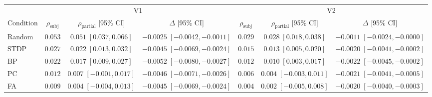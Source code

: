 \begin{tabular}{lcccccc}
\toprule
 & \multicolumn{3}{c}{V1} & \multicolumn{3}{c}{V2} \\
\cmidrule(lr){2-4} \cmidrule(lr){5-7}
Condition & $\rho_{\text{subj}}$ & $\rho_{\text{partial}}$ [95\% CI] & $\Delta$ [95\% CI] & $\rho_{\text{subj}}$ & $\rho_{\text{partial}}$ [95\% CI] & $\Delta$ [95\% CI] \\
\midrule
Random & $0.053$ & $0.051\;[0.037,0.066]$ & $-0.0025\;[-0.0042,-0.0011]$ & $0.029$ & $0.028\;[0.018,0.038]$ & $-0.0011\;[-0.0024,-0.0000]$ \\
STDP & $0.027$ & $0.022\;[0.013,0.032]$ & $-0.0045\;[-0.0069,-0.0024]$ & $0.015$ & $0.013\;[0.005,0.020]$ & $-0.0020\;[-0.0041,-0.0002]$ \\
BP & $0.022$ & $0.017\;[0.009,0.027]$ & $-0.0052\;[-0.0080,-0.0027]$ & $0.012$ & $0.010\;[0.003,0.017]$ & $-0.0022\;[-0.0045,-0.0002]$ \\
PC & $0.012$ & $0.007\;[-0.001,0.017]$ & $-0.0046\;[-0.0071,-0.0026]$ & $0.006$ & $0.004\;[-0.003,0.011]$ & $-0.0021\;[-0.0041,-0.0005]$ \\
FA & $0.009$ & $0.004\;[-0.004,0.013]$ & $-0.0045\;[-0.0069,-0.0024]$ & $0.004$ & $0.002\;[-0.005,0.008]$ & $-0.0020\;[-0.0040,-0.0003]$ \\
\bottomrule
\end{tabular}
